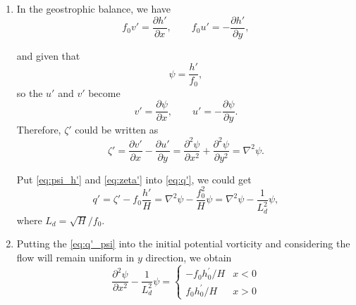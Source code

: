 \documentclass[a4paper]{article}
\begin{document}
\begin{enumerate}[label=\textbf{\arabic*.}]
\begin{enumerate}[label=\textbf{(\alph*)}]
		
		\item 
		
		In the geostrophic balance, we have
		$$ f_0 v' = \frac{\partial h'}{\partial x}, \qquad f_0 u' = -\frac{\partial h'}{\partial y},$$
		
		and given that
		\begin{equation}\label{eq:psi_h'}
		\psi = \frac{ h'}{f_0},
		\end{equation}
		so the $u'$ and $v'$ become 
		$$v' = \frac{\partial \psi}{\partial x}, \qquad u' = -\frac{\partial \psi}{\partial y}.$$
		Therefore, $\zeta'$ could be written as
		\begin{equation}\label{eq:zeta'}
		\zeta'=\frac{\partial v'}{\partial x}-\frac{\partial u'}{\partial y}=\frac{\partial^2 \psi}{\partial x^2}+\frac{\partial^2 \psi}{\partial y^2}=\nabla ^2\psi.
		\end{equation}
		
		Put \eqref{eq:psi_h'} and \eqref{eq:zeta'} into \eqref{eq:q'}, we could get
		\begin{equation}\label{eq:q'_psi}
		q'=\zeta'-f_0\frac{h'}{H}= \nabla ^2\psi-\frac{f_0^2}{H}\psi=\nabla ^2\psi-\frac{1}{L_d^2}\psi,
		\end{equation}
		where $L_d=\sqrt{H}/f_0$.
		
		\item  Putting the \eqref{eq:q'_psi} into the initial potential vorticity and considering the flow will remain uniform in $y$ direction, we obtain 
		\begin{equation}\label{eq:psi_ctrl}
			\frac{\partial^2 \psi}{\partial x^2}-\frac{1}{L_d^2}\psi = \left\{ 
			\begin{array} 
			{cl} {-f_{0} h_{0}^{\prime } / H } & { x < 0} \\ 
			{f_{0} h_{0}^{\prime } / H } & { x > 0}
			\end{array} \right.
		\end{equation}
		

\end{enumerate}
\end{enumerate}
\end{document}

